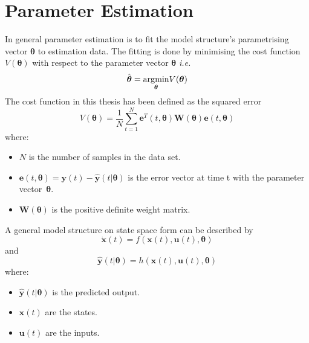 \section{Parameter Estimation} 
In general parameter estimation is to fit the model structure's parametrising vector $\boldsymbol{\theta}$ to estimation data. The fitting is done by minimising the cost function $V(\boldsymbol{\theta})$ with respect to the parameter vector $\boldsymbol{\theta}$ \emph{i.e.}
\begin{equation}
\hat{\boldsymbol{\theta}} = \underset{\boldsymbol{\theta}}{\operatorname*{\arg\!\min}} V(\boldsymbol{\theta})
\end{equation}
The cost function in this thesis has been defined as the squared error
\begin{equation}
    V(\boldsymbol{\theta}) = \frac{1}{N} \sum_{t=1}^{N} \boldsymbol{e}^T(t,\boldsymbol{\theta}) \boldsymbol{W}(\boldsymbol{\theta})  \boldsymbol{e}(t,\boldsymbol{\theta})
\end{equation}
where:
\begin{itemize}
    \item $N$ is the number of samples in the data set.
    \item $\boldsymbol{e}(t,\boldsymbol{\theta}) = \boldsymbol{y}(t) - \hat{\boldsymbol{y}}(t|\boldsymbol{\theta})$ is the error vector at time t with the parameter vector~$\boldsymbol{\theta}$.
    \item $\boldsymbol{W}(\boldsymbol{\theta})$ is the positive definite weight matrix.
\end{itemize}

A general model structure on state space form can be described by
\begin{equation}
\dot{\boldsymbol{x}}(t) = f(\boldsymbol{x}(t), \boldsymbol{u}(t), \boldsymbol{\theta})
\end{equation}
and
\begin{equation}
\hat{\boldsymbol{y}}(t|\boldsymbol{\theta}) = h(\boldsymbol{x}(t), \boldsymbol{u}(t), \boldsymbol{\theta})
\end{equation}
 where:
 \begin{itemize}
  \item $\hat{\boldsymbol{y}}(t|\boldsymbol{\theta})$ is the predicted output.
  \item $\boldsymbol{x}(t)$ are the states. 
  \item $\boldsymbol{u}(t)$ are the inputs. 
 \end{itemize}

